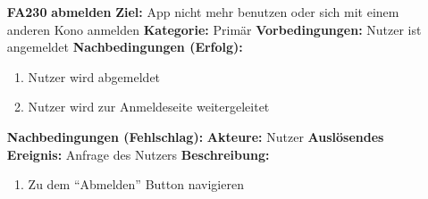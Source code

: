 \documentclass[parskip=full]{scrartcl}
\begin{document}
\begin{itemize}[nosep]
			\item[\textbf{FA230}]\textbf{abmelden}
							\newline \textbf{Ziel:} App nicht mehr benutzen oder sich mit einem anderen Kono anmelden
							\newline \textbf{Kategorie:} Primär
							\newline \textbf{Vorbedingungen:} Nutzer ist angemeldet
							\newline \textbf{Nachbedingungen (Erfolg):} 
							\begin{enumerate}[nosep]
								\item Nutzer wird abgemeldet
								\item Nutzer wird zur Anmeldeseite weitergeleitet 
							\end{enumerate}
							\textbf{Nachbedingungen (Fehlschlag):}
							\newline \textbf{Akteure:} Nutzer
							\newline \textbf{Auslösendes Ereignis:} Anfrage des Nutzers
							\newline \textbf{Beschreibung:}
							\begin{enumerate}[nosep]
								\item Zu dem “Abmelden” Button navigieren\\
							\end{enumerate}
							
		\end{itemize}
		
\end{document}

